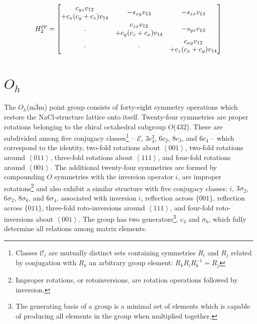\documentclass[twocolumn,showpacs,preprintnumbers,superscriptaddress,prb,floatfix,aps,10pt]{revtex4-1}
\newcommand*{\class}{\mathcal{C}}
\newcommand*{\id}{\mathcal{E}}
\begin{document}
\begin{equation}
H^{pp}_2 =
\begin{bmatrix}
              c_{yz} v_{12} & \multirow{2}{*}{$-s_{xy} v_{13}$} & \multirow{2}{*}{$-s_{zx} v_{13}$}  \\
+c_{x} (c_{y}+c_{z}) v_{14} &                                   &                                    \\
\multirow{2}{*}{.}          &               c_{zx} v_{12}       & \multirow{2}{*}{$-s_{yz} v_{13}$}  \\
                            & +c_{y} (c_{z}+c_{x}) v_{14}       &                                    \\
\multirow{2}{*}{.}          & \multirow{2}{*}{.}                &          c_{xy} v_{12}             \\ 
                            &                                   &        +c_{z} (c_{x}+c_{y}) v_{14} \\
\end{bmatrix}
\end{equation}






\section{$O_h$}
\label{appendix:pg}
The $O_h$(m$\bar{3}$m) point group consists of forty-eight symmetry operations which restore the NaCl-structure lattice onto itself. Twenty-four symmetries are proper rotations belonging to the chiral octahedral subgroup $O$(432). These are subdivided among five conjugacy classes\footnote{Classes $\class_i$ are mutually distinct sets containing symmetries $R_i$ and $R_j$ related by conjugation with $R_k$ an arbitrary group element: $R_kR_iR_k^{-1}=R_j$} --  $\id$, $3c_4^2$, $6c_2$, $8c_3$, and $6c_4$ -- which correspond to the identity, two-fold rotations about $\left<001\right>$, two-fold rotations around $\left<011\right>$, three-fold rotations about $\left<111\right>$, and four-fold rotations around $\left<001\right>$. The additional twenty-four symmetries are formed by compounding $O$ symmetries with the inversion operator $i$, are improper rotations\footnote{Improper rotations, or rotoinversions, are rotation operations followed by inversion.} and also exhibit a similar structure with five conjugacy classes: $i$, $3\sigma_2$, $6\sigma_2$, $8\sigma_6$, and $6\sigma_4$, associated with inversion $i$, reflection across $\{001\}$, reflection across $\{011\}$, three-fold roto-inversions around $\left<111\right>$, and four-fold roto-inversions about $\left<001\right>$. The group has two generators\footnote{The generating basis of a group is a minimal set of elements which is capable of producing all elements in the group when multiplied together.}, $c_4$ and $\sigma_6$, which fully determine all relations among matrix elements.
\end{document}
